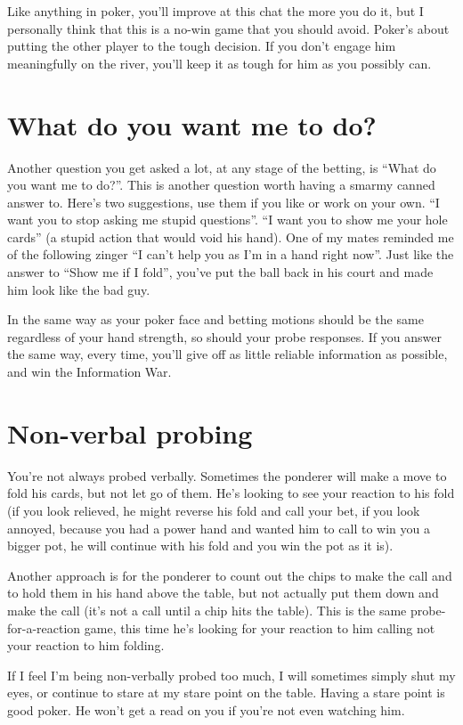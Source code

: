 \begin{itemize}
    Like anything in poker, you'll improve at this chat the more you
    do it, but I personally think that this is a no-win game that you
    should avoid. Poker's about putting the other player to the tough
    decision. If you don't engage him meaningfully on the river,
    you'll keep it as tough for him as you possibly can.
    
\end{itemize}

\section{What do you want me to do?}

Another question you get asked a lot, at any stage of the betting, is
``What do you want me to do?''. This is another question worth having
a smarmy canned answer to. Here's two suggestions, use them if you
like or work on your own. ``I want you to stop asking me stupid
questions''. ``I want you to show me your hole cards'' (a stupid
action that would void his hand). One of my mates reminded
me of the following zinger ``I can't help you as I'm in a hand right
now''. Just like the answer to ``Show me if I fold'', you've put the
ball back in his court and made him look like the bad guy.

In the same way as your poker face and betting motions should be the
same regardless of your hand strength, so should your probe
responses. If you answer the same way, every time, you'll give off
as little reliable information as possible, and win the
Information War.

\section{Non-verbal probing}

You're not always probed verbally. Sometimes the ponderer
will make a move to fold his cards, but not let go of them. He's looking
to see your reaction to his fold (if you look relieved, he might reverse
his fold and call your bet, if you look annoyed, because you had a power
hand and wanted him to call to win you a bigger pot, he will continue
with his fold and you win the pot as it is).

Another approach is for the ponderer to count out the chips to make
the call and to hold them in his hand above the table, but not
actually put them down and make the call (it's not a call until a chip
hits the table). This is the same probe-for-a-reaction game, this time
he's looking for your reaction to him calling not your reaction to him
folding.

If I feel I'm being non-verbally probed too much, I will sometimes
simply shut my eyes, or continue to stare at my stare point on the
table. Having a stare point is good poker. He won't get a read on
you if you're not even watching him.
